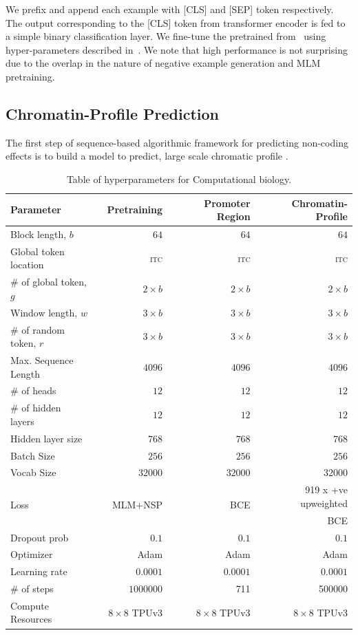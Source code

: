 We prefix and append each example with [CLS] and [SEP] token respectively.
The output corresponding to the [CLS] token from \bigb transformer encoder is fed to a simple binary classification layer.
We fine-tune the pretrained \bigb from~ using hyper-parameters described in~.
We note that high performance is not surprising due to the overlap in the nature of negative example generation and MLM pretraining.


\subsection{Chromatin-Profile Prediction}
The first step of sequence-based algorithmic framework for predicting non-coding effects is to build a model to predict, large scale chromatic profile \citep{zhou2015predicting}. 
\begin{table}[b]
\small
\centering
\begin{tabular}{@{} l r r c r c r @{}}
\toprule
Parameter & & Pretraining & & Promoter Region & & Chromatin-Profile \\
\midrule
 Block length, $b$ & & $64$ & & $64$& & $64$\\
Global token location & & \textsc{itc} & & \textsc{itc}& & \textsc{itc} \\
 $\#$ of global token, $g$ & & $2\times b$ & & $2\times b$& & $2\times b$ \\
 Window length, $w$  & & $3\times b$ & & $3\times b$& & $3\times b$ \\
 $\#$ of random token, $r$ & & $3\times b$ & & $3\times b$& & $3\times b$ \\
 Max. Sequence Length & & $4096$ & & $4096$& & $4096$\\
 $\#$ of heads & & $12$ & & $12$& & $12$\\
 $\#$ of hidden layers & & $12$ & & $12$& & $12$ \\
 Hidden layer size & & $768$ & & $768$ & & $768$ \\
 Batch Size & & $256$ & & $256$& & $256$ \\
 Vocab Size & & $32000$ & & $32000$& & $32000$\\
 \multirow{2}{*}{Loss} & & \multirow{2}{*}{MLM+NSP} & & \multirow{2}{*}{BCE} & & 919 x +ve upweighted \\
  & &  & &  & & BCE \\
 Dropout prob & & $0.1$ & & $0.1$ & & $0.1$ \\
 Optimizer & & Adam & & Adam & & Adam\\
 Learning rate & & $0.0001$  & & $0.0001$ & & $0.0001$\\
 $\#$ of steps & & $1000000$ & & 711 && 500000 \\
  Compute Resources & & $8 \times 8$ TPUv3 & & $8 \times 8$ TPUv3 & & $8 \times 8$ TPUv3\\
\bottomrule
\end{tabular}
\vspace{2mm}
\caption{Table of hyperparameters for Computational biology.}
\label{tab:app_bio}
\end{table}
